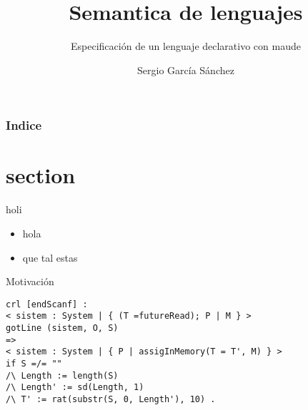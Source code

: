 \documentclass{beamer}
\title{Semantica de lenguajes}
\subtitle{Especificación de un lenguaje declarativo con maude}
\author{Sergio García Sánchez}
\institute{UCM}
\date{\mydate}
\begin{document}
    \begin{frame}
        \titlepage
    \end{frame}

    \begin{frame}
        \frametitle{Indice}
        \tableofcontents
    \end{frame}


    \section{section}
    \begin{frame}{holi}
        \begin{itemize}
            \item hola
            \item que tal estas
        \end{itemize}
    \end{frame}

    \begin{frame}[fragile]{Motivación}
        \begin{verbatim}
crl [endScanf] :
< sistem : System | { (T =futureRead); P | M } > 
gotLine (sistem, O, S)
=>
< sistem : System | { P | assigInMemory(T = T', M) } > 
if S =/= "" 
/\ Length := length(S)
/\ Length' := sd(Length, 1)
/\ T' := rat(substr(S, 0, Length'), 10) .
        \end{verbatim}
      \end{frame}
\end{document}
